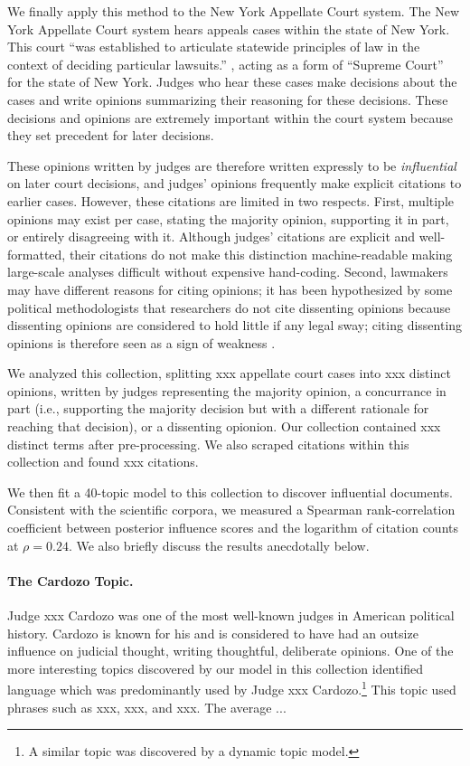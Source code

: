 We finally apply this method to the New York Appellate Court
system. The New York Appellate Court system hears appeals cases within
the state of New York.  This court ``was established to articulate
statewide principles of law in the context of deciding particular
lawsuits.'' \cite{}, acting as a form of ``Supreme Court'' for the
state of New York.  Judges who hear these cases make decisions about
the cases and write opinions summarizing their reasoning for these
decisions.  These decisions and opinions are extremely important
within the court system because they set precedent for later
decisions.

These opinions written by judges are therefore written expressly to be
\emph{influential} on later court decisions, and judges' opinions
frequently make explicit citations to earlier cases.  However, these
citations are limited in two respects.  First, multiple opinions may
exist per case, stating the majority opinion, supporting it in part,
or entirely disagreeing with it. Although judges' citations are
explicit and well-formatted, their citations do not make this
distinction machine-readable making large-scale analyses difficult
without expensive hand-coding. Second, lawmakers may have different
reasons for citing opinions; it has been hypothesized by some
political methodologists that researchers do not cite dissenting
opinions because dissenting opinions are considered to hold little if
any legal sway; citing dissenting opinions is therefore seen as a sign
of weakness \cite{beim:2011}.

We analyzed this collection, splitting xxx appellate court cases into
xxx distinct opinions, written by judges representing the majority
opinion, a concurrance in part (i.e., supporting the majority decision
but with a different rationale for reaching that decision), or a
dissenting opionion.  Our collection contained xxx distinct terms
after pre-processing. We also scraped citations within this collection
and found xxx citations.

We then fit a 40-topic model to this collection to discover
influential documents.  Consistent with the scientific corpora, we
measured a Spearman rank-correlation coefficient between posterior
influence scores and the logarithm of citation counts at $\rho=0.24$.
We also briefly discuss the results anecdotally below.

\paragraph{The Cardozo Topic.} Judge xxx Cardozo was one of the most
well-known judges in American political history.  Cardozo is known for
his and is considered to have had an outsize influence on judicial
thought, writing thoughtful, deliberate opinions.  One of the more
interesting topics discovered by our model in this collection
identified language which was predominantly used by Judge xxx
Cardozo.\footnote{A similar topic was discovered by a dynamic topic
  model.}  This topic used phrases such as xxx, xxx, and xxx. The
average ...